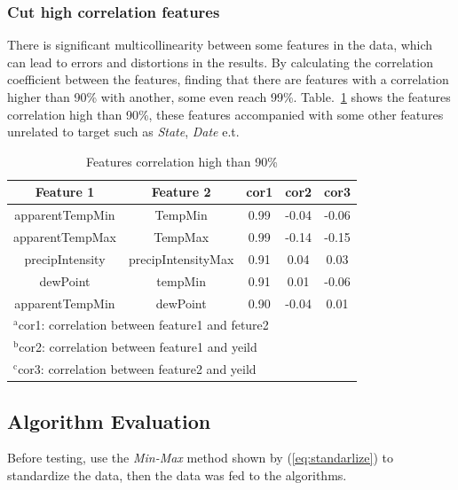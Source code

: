 \documentclass[conference, a4paper]{IEEEtran}
\begin{document}
  \subsubsection{Cut high correlation features}
    There is significant multicollinearity between some features in the data, which can lead to errors and distortions in the results\cite{farrarMulticollinearityRegressionAnalysis1967}. By calculating the correlation coefficient between the features, finding that there are features with a correlation higher than 90\% with another, some even reach 99\%. Table.~\ref{tab:correlation} shows the features correlation high than 90\%, these features accompanied with some other features unrelated to target such as \textit{State}, \textit{Date} e.t.
    \begin{table}[htbp]
      \caption{Features correlation high than 90\%}
      \begin{center}
        \begin{tabular}{|c|c|c|c|c|}
          \hline
          Feature 1 & Feature 2 & cor1 & cor2 & cor3\\
          \hline
          apparentTempMin & TempMin     & 0.99 & -0.04 & -0.06 \\
          apparentTempMax & TempMax     & 0.99 & -0.14 & -0.15 \\
          precipIntensity & precipIntensityMax & 0.91 & 0.04  & 0.03  \\
          dewPoint & tempMin & 0.91 & 0.01  & -0.06 \\
          apparentTempMin & dewPoint & 0.90 & -0.04 & 0.01 \\
          \hline
          \multicolumn{5}{l}{$^{\mathrm{a}}$cor1: correlation between feature1 and feture2} \\
          \multicolumn{5}{l}{$^{\mathrm{b}}$cor2: correlation between feature1 and yeild} \\ 
          \multicolumn{5}{l}{$^{\mathrm{c}}$cor3: correlation between feature2 and yeild} \\
        \end{tabular}
        \label{tab:correlation}
      \end{center}
    \end{table}

  \subsection{Algorithm Evaluation}
    Before testing, use the \textit{Min-Max} method shown by (\ref{eq:standarlize}) to standardize the data, then the data was fed to the algorithms.
\end{document}
